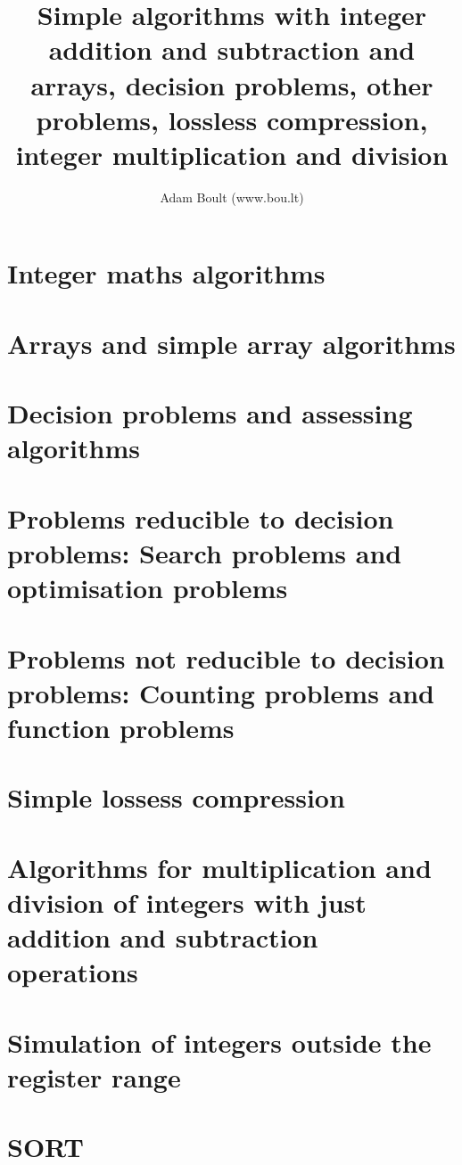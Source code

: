 \documentclass[oneside]{book}
\begin{document}
\author{Adam Boult (www.bou.lt)}
\title{Simple algorithms with integer addition and subtraction and arrays, decision problems, other problems, lossless compression, integer multiplication and division}
\maketitle

\setcounter{tocdepth}{0}
\tableofcontents



\part{Integer maths algorithms}






\part{Arrays and simple array algorithms}











\part{Decision problems and assessing algorithms}








\part{Problems reducible to decision problems: Search problems and optimisation problems}



\part{Problems not reducible to decision problems: Counting problems and function problems}





\part{Simple lossess compression}


\part{Algorithms for multiplication and division of integers with just addition and subtraction operations}

\part{Simulation of integers outside the register range}

\part{SORT}

\end{document}
